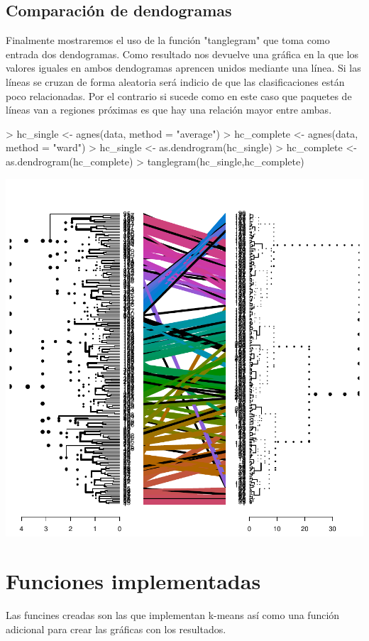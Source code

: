\documentclass [a4paper] {article}
\begin{document}
\newpage
\subsection{Comparación de dendogramas}
Finalmente mostraremos el uso de la función "tanglegram" que toma como entrada dos dendogramas.
Como resultado nos devuelve una gráfica en la que los valores iguales en ambos dendogramas aprencen unidos mediante una línea.
Si las líneas se cruzan de forma aleatoria será indicio de que las clasificaciones están poco relacionadas.
Por el contrario si sucede como en este caso que paquetes de líneas van a regiones próximas es que hay una relación mayor entre ambas.
\begin{center}
\begin{Schunk}
\begin{Sinput}
> hc_single <- agnes(data, method = "average")
> hc_complete <- agnes(data, method = "ward")
> hc_single <- as.dendrogram(hc_single)
> hc_complete <- as.dendrogram(hc_complete)
> tanglegram(hc_single,hc_complete)
\end{Sinput}
\end{Schunk}
\includegraphics{entrega-jerarquico_comparacion_dendogramas}
\end{center}

\newpage
\section{Funciones implementadas}
Las funcines creadas son las que implementan k-means así como una función adicional para crear las gráficas con los resultados.
\end{document}
